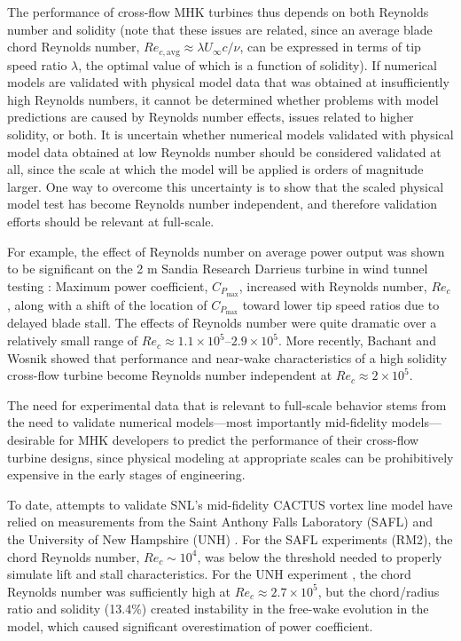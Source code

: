 \documentclass[10pt,letterpaper]{article}
\begin{document}
The performance of cross-flow MHK turbines thus depends on both Reynolds number
and solidity (note that these issues are related, since an average blade chord
Reynolds number, $Re_{c,\mathrm{avg}} \approx \lambda U_\infty c/ \nu$, can be
expressed in terms of tip speed ratio $\lambda$, the optimal value of which is a
function of solidity). If numerical models are validated with physical model
data that was obtained at insufficiently high Reynolds numbers, it cannot be
determined whether problems with model predictions are caused by Reynolds number
effects, issues related to higher solidity, or both. It is uncertain whether
numerical models validated with physical model data obtained at low Reynolds
number should be considered validated at all, since the scale at which the model
will be applied is orders of magnitude larger. One way to overcome this
uncertainty is to show that the scaled physical model test has become Reynolds
number independent, and therefore validation efforts should be relevant at
full-scale.

For example, the effect of Reynolds number on average power output was shown to
be significant on the 2 m Sandia Research Darrieus turbine in wind tunnel
testing \cite{Blackwell1976}: Maximum power coefficient, $C_{P_{\max}}$,
increased with Reynolds number, $Re_c$, along with a shift of the location of
$C_{P_{\max}}$ toward lower tip speed ratios due to delayed blade stall. The
effects of Reynolds number were quite dramatic over a relatively small range of
$Re_c \approx 1.1 \times 10^5$--$2.9 \times 10^5$. More recently, Bachant and
Wosnik \cite{Bachant2014, Bachant2015-RVAT-Re-dep} showed that performance and
near-wake characteristics of a high solidity cross-flow turbine become Reynolds
number independent at $Re_c \approx 2 \times 10^5$.

The need for experimental data that is relevant to full-scale behavior stems
from the need to validate numerical models---most importantly mid-fidelity
models---desirable for MHK developers to predict the performance of their
cross-flow turbine designs, since physical modeling at appropriate scales can be
prohibitively expensive in the early stages of engineering.

To date, attempts to validate SNL's mid-fidelity CACTUS vortex line model
\cite{Murray2011} have relied on measurements from the Saint Anthony Falls
Laboratory (SAFL) \cite{Hill2014} and the University of New Hampshire (UNH)
\cite{Neary2013, Michelen2014}. For the SAFL experiments (RM2), the chord
Reynolds number, $Re_c \sim 10^4$, was below the threshold needed to properly
simulate lift and stall characteristics. For the UNH experiment
\cite{Bachant2013}, the chord Reynolds number was sufficiently high at $Re_c
\approx 2.7 \times 10^5$, but the chord/radius ratio and solidity (13.4\%)
created instability in the free-wake evolution in the model, which caused
significant overestimation of power coefficient.
\end{document}
